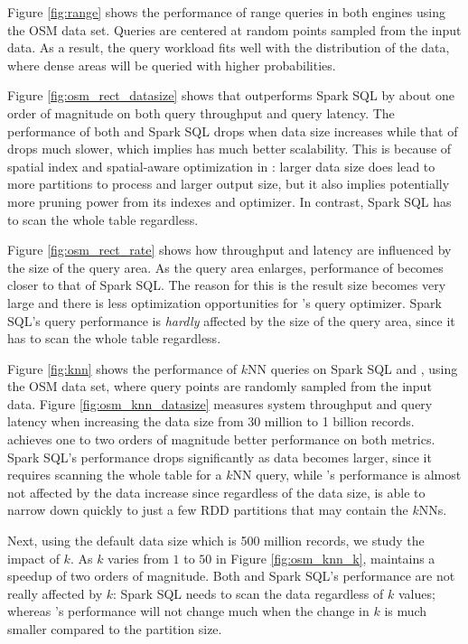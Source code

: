 Figure \ref{fig:range} shows the performance of range queries in both
engines using the OSM data set. Queries are centered at random points
sampled from the input data. As a result, the query workload fits well
with the distribution of the data, where dense areas will be queried
with higher probabilities.

Figure \ref{fig:osm_rect_datasize} shows that \name outperforms Spark
SQL by about one order of magnitude on both query throughput and query
latency.  The performance of both \name and Spark SQL drops when data
size increases while that of \name drops much slower, which implies
\name has much better scalability. This is because of spatial index
and spatial-aware optimization in \name: larger data size does lead to
more partitions to process and larger output size, but it also implies
potentially more pruning power from its indexes and optimizer. In
contrast, Spark SQL has to scan the whole table regardless.

Figure \ref{fig:osm_rect_rate} shows how throughput and latency are
influenced by the size of the query area. As the query area enlarges,
performance of \name becomes closer to that of Spark SQL. The reason
for this is the result size becomes very large and there is less
optimization opportunities for \name's query optimizer. Spark SQL's
query performance is {\em hardly} affected by the size of the query
area, since it has to scan the whole table regardless.

Figure \ref{fig:knn} shows the performance of $k$NN queries on Spark
SQL and \name, using the OSM data set, where query points are randomly
sampled from the input data.
Figure \ref{fig:osm_knn_datasize} measures system throughput and query
latency when increasing the data size from 30 million to 1 billion
records. \name achieves one to two orders of magnitude better
performance on both metrics. Spark SQL's performance drops
significantly as data becomes larger, since it requires scanning the
whole table for a $k$NN query, while \name's performance is almost not
affected by the data increase since regardless of the data size, \name
is able to narrow down quickly to just a few RDD partitions that may
contain the $k$NNs.

Next, using the default data size which is 500 million records, we
study the impact of $k$. As $k$ varies from $1$ to $50$ in Figure
\ref{fig:osm_knn_k}, \name maintains a speedup of two orders of
magnitude. Both \name and Spark SQL's performance are not really
affected by $k$: Spark SQL needs to scan the data regardless of $k$
values; whereas \name's performance will not change much when the
change in $k$ is much smaller compared to the partition size.


